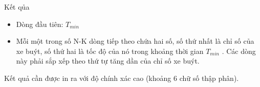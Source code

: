 Kết qủa
\begin{itemize}
	\item     Dòng đầu tiên: $T_{min}$
	\item     Mỗi một trong số N-K dòng tiếp theo chứa hai số, số thứ nhất là chỉ số của xe buýt, số thứ hai là tốc độ của nó trong khoảng thời gian   $T_{min}$    . Các dòng này phải sắp xếp theo thứ tự tăng dần của chỉ số xe buýt.   
\end{itemize}

   Kết quả cần được in ra với độ chính xác cao (khoảng 6 chữ số thập phân).